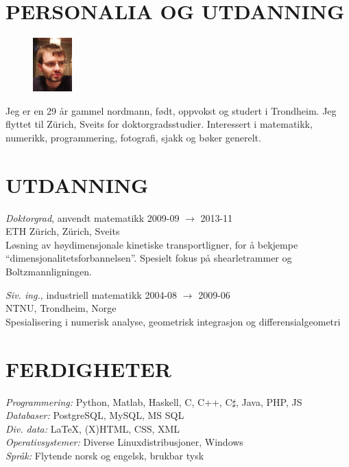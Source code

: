 \documentclass[line,margin]{res}
\newcommand{\zh}{Z\"{u}rich}
\begin{document}
\address{Forchstrasse 168, CH-8032 \zh}
\address{+41 78 634 68 37, evfonn@gmail.com}


\begin{resume}

\section{PERSONALIA OG UTDANNING}
    \begin{figure}
        \vspace{-0.6cm}
        \includegraphics[width=1.5cm]{photo.png}
    \end{figure}
    Jeg er en 29 år gammel nordmann, født, oppvokst og studert i Trondheim. Jeg flyttet til \zh,
    Sveits for doktorgradsstudier. Interessert i matematikk, numerikk, programmering, fotografi, sjakk og
    bøker generelt.


\section{UTDANNING} 
    {\em Doktorgrad}, anvendt matematikk \hfill 2009-09 $\to$ 2013-11 \\
    ETH \zh, \zh, Sveits \\
    Løsning av høydimensjonale kinetiske transportligner, for å bekjempe
    ``dimensjonalitetsforbannelsen''. Spesielt fokus på shearlet\-rammer og
    Boltzmann\-ligningen.

    {\em Siv. ing.}, industriell matematikk \hfill 2004-08 $\to$ 2009-06 \\
    NTNU, Trondheim, Norge \\
    Spesialisering i numerisk analyse, geometrisk integrasjon og differensialgeometri


\section{FERDIGHETER}
    {\em Programmering:} Python, Matlab, Haskell, C, C++, C$\sharp$, Java, PHP, JS \\
    {\em Databaser:} PostgreSQL, MySQL, MS SQL \\
    {\em Div. data:} \LaTeX, (X)HTML, CSS, XML \\
    {\em Operativsystemer:} Diverse Linuxdistribusjoner, Windows \\
    {\em Språk:} Flytende norsk og engelsk, brukbar tysk



\end{resume}
\end{document}
